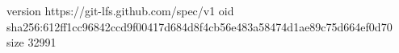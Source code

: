 version https://git-lfs.github.com/spec/v1
oid sha256:612ff1cc96842ccd9f00417d684d8f4cb56e483a58474d1ae89c75d664ef0d70
size 32991
